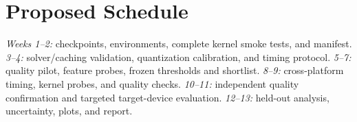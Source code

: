 \documentclass[conference]{IEEEtran}
\begin{document}
\section{Proposed Schedule}

\textit{Weeks 1--2:} checkpoints, environments, complete kernel smoke tests, and manifest.
\textit{3--4:} solver/caching validation, quantization calibration, and timing protocol.
\textit{5--7:} quality pilot, feature probes, frozen thresholds and shortlist.
\textit{8--9:} cross-platform timing, kernel probes, and quality checks.
\textit{10--11:} independent quality confirmation and targeted target-device evaluation.
\textit{12--13:} held-out analysis, uncertainty, plots, and report.

\end{document}
